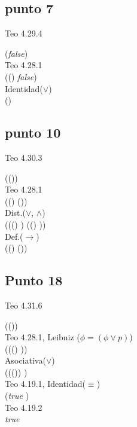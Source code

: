 \documentclass{article}
\begin{document}
\subsection{punto 7}
\begin{logicenv}{Teo 4.29.4}
    \begin{derivation}
            (\phi \to \textrm{\textit{false}})\\
        Teo 4.28.1\\
            ((\neg \phi) \lor \textrm{\textit{false}})\\
        Identidad($\lor$)\\
            (\neg \phi)
    \end{derivation}
\end{logicenv}

\subsection{punto 10}
\begin{logicenv}{Teo 4.30.3}
    \begin{derivation}
            (\phi \to (\psi \land \tau))\\
        Teo 4.28.1\\
            ((\neg \phi) \lor (\psi \land \tau))\\
        Dist.($\lor$, $\land$)\\
            (((\neg \phi) \lor \psi) \land ((\neg \phi) \lor \tau))\\
        Def.($\to$)\\
            ((\phi \to \psi) \land (\phi \to \tau))
    \end{derivation}
\end{logicenv}

\subsection{Punto 18}
\begin{logicenv}{Teo 4.31.6}
    \begin{derivation}
            (\phi \lor (\phi \to \psi))\\
        Teo 4.28.1, Leibniz ($\phi = (\phi \lor p)$)\\
            (\phi \lor ((\neg \phi) \lor \psi))\\
        Asociativa($\lor$)\\
            ((\phi \lor (\neg \phi)) \lor \psi)\\
        Teo 4.19.1, Identidad($\equiv$)\\
            (\textrm{\textit{true}} \lor \psi)\\
        Teo 4.19.2\\
            \textrm{\textit{true}}
    \end{derivation}
\end{logicenv}
\end{document}

